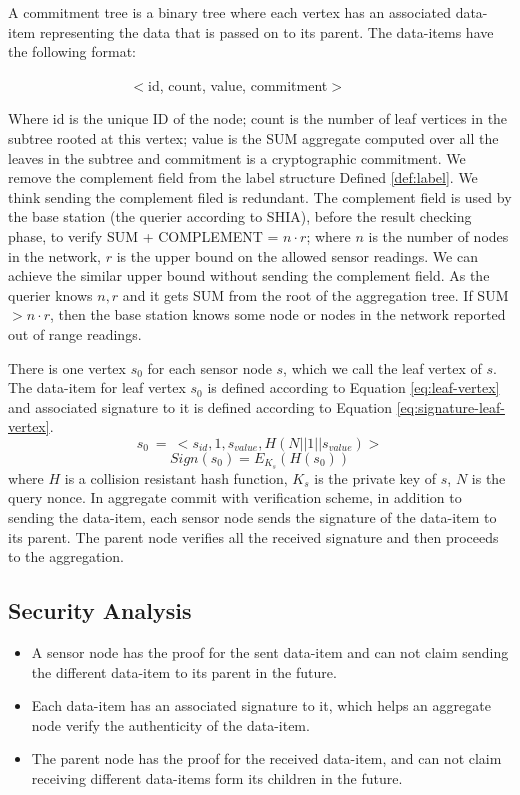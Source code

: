 	\begin{definition}
		\label{def:data-item}
		A commitment tree is a binary tree where each vertex has an associated data-item representing the data that is passed on to its parent. The data-items have the following format:

		$\hspace{100pt}$ $<$id, count, value, commitment$>$
	\end{definition}
	Where id is the unique ID of the node; count is the number of leaf vertices in the subtree rooted at this vertex; value is the SUM aggregate computed over all the leaves in the subtree and commitment is a cryptographic commitment.
	We remove the complement field from the label structure Defined \ref{def:label}. 
	We think sending the complement filed is redundant. 
	The complement field is used by the base station (the querier according to SHIA), before the result checking phase, to verify SUM + COMPLEMENT = $n \cdot r$; where $n$ is the number of nodes in the network, $r$ is the upper bound on the allowed sensor readings.
	We can achieve the similar upper bound without sending the complement field.
	As the querier knows $n, r$ and it gets SUM from the root of the aggregation tree.
	If SUM $> n \cdot r$, then the base station knows some node or nodes in the network reported out of range readings. 

	There is one vertex $s_{0}$ for each sensor node $s$, which we call the leaf vertex of $s$.
	The data-item for leaf vertex $s_{0}$ is defined according to Equation \ref{eq:leaf-vertex} and associated signature to it is defined according to Equation \ref{eq:signature-leaf-vertex}.
	\begin{equation}
		\label{eq:leaf-vertex}
		s_{0}\ =\ <s_{id}, 1, s_{value}, H(N||1||s_{value})>
	\end{equation}
	\begin{equation}
		\label{eq:signature-leaf-vertex}
		Sign(s_{0}) = E_{K_{s}}(H(s_{0}))
	\end{equation}
	where $H$ is a collision resistant hash function, $K_{s}$ is the private key of $s$, $N$ is the query nonce.
	In aggregate commit with verification scheme, in addition to sending the data-item, each sensor node sends the signature of the data-item to its parent.
	The parent node verifies all the received signature and then proceeds to the aggregation.
	
	\subsection{Security Analysis}
		\begin{itemize}
			\item A sensor node has the proof for the sent data-item and can not claim sending the different data-item to its parent in the future.
			\item Each data-item has an associated signature to it, which helps an aggregate node verify the authenticity of the data-item.
			\item The parent node has the proof for the received data-item, and can not claim receiving different data-items form its children in the future.
		\end{itemize}

